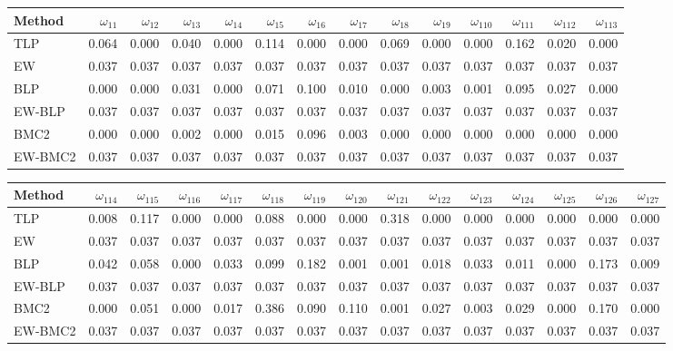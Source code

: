 \documentclass[
]{article}
\begin{document}
\begin{tabular}{lrrrrrrrrrrrrr}
\toprule
Method & $\omega_{11}$ & $\omega_{12}$ & $\omega_{13}$ & $\omega_{14}$ & $\omega_{15}$ & $\omega_{16}$ & $\omega_{17}$ & $\omega_{18}$ & $\omega_{19}$ & $\omega_{110}$ & $\omega_{111}$ & $\omega_{112}$ & $\omega_{113}$\\
\midrule
TLP & 0.064 & 0.000 & 0.040 & 0.000 & 0.114 & 0.000 & 0.000 & 0.069 & 0.000 & 0.000 & 0.162 & 0.020 & 0.000\\
EW & 0.037 & 0.037 & 0.037 & 0.037 & 0.037 & 0.037 & 0.037 & 0.037 & 0.037 & 0.037 & 0.037 & 0.037 & 0.037\\
BLP & 0.000 & 0.000 & 0.031 & 0.000 & 0.071 & 0.100 & 0.010 & 0.000 & 0.003 & 0.001 & 0.095 & 0.027 & 0.000\\
EW-BLP & 0.037 & 0.037 & 0.037 & 0.037 & 0.037 & 0.037 & 0.037 & 0.037 & 0.037 & 0.037 & 0.037 & 0.037 & 0.037\\
BMC2 & 0.000 & 0.000 & 0.002 & 0.000 & 0.015 & 0.096 & 0.003 & 0.000 & 0.000 & 0.000 & 0.000 & 0.000 & 0.000\\
EW-BMC2 & 0.037 & 0.037 & 0.037 & 0.037 & 0.037 & 0.037 & 0.037 & 0.037 & 0.037 & 0.037 & 0.037 & 0.037 & 0.037\\
\bottomrule
\end{tabular}

\begin{tabular}{lrrrrrrrrrrrrrr}
\toprule
Method & $\omega_{114}$ & $\omega_{115}$ & $\omega_{116}$ & $\omega_{117}$ & $\omega_{118}$ & $\omega_{119}$ & $\omega_{120}$ & $\omega_{121}$ & $\omega_{122}$ & $\omega_{123}$ & $\omega_{124}$ & $\omega_{125}$ & $\omega_{126}$ & $\omega_{127}$\\
\midrule
TLP & 0.008 & 0.117 & 0.000 & 0.000 & 0.088 & 0.000 & 0.000 & 0.318 & 0.000 & 0.000 & 0.000 & 0.000 & 0.000 & 0.000\\
EW & 0.037 & 0.037 & 0.037 & 0.037 & 0.037 & 0.037 & 0.037 & 0.037 & 0.037 & 0.037 & 0.037 & 0.037 & 0.037 & 0.037\\
BLP & 0.042 & 0.058 & 0.000 & 0.033 & 0.099 & 0.182 & 0.001 & 0.001 & 0.018 & 0.033 & 0.011 & 0.000 & 0.173 & 0.009\\
EW-BLP & 0.037 & 0.037 & 0.037 & 0.037 & 0.037 & 0.037 & 0.037 & 0.037 & 0.037 & 0.037 & 0.037 & 0.037 & 0.037 & 0.037\\
BMC2 & 0.000 & 0.051 & 0.000 & 0.017 & 0.386 & 0.090 & 0.110 & 0.001 & 0.027 & 0.003 & 0.029 & 0.000 & 0.170 & 0.000\\
EW-BMC2 & 0.037 & 0.037 & 0.037 & 0.037 & 0.037 & 0.037 & 0.037 & 0.037 & 0.037 & 0.037 & 0.037 & 0.037 & 0.037 & 0.037\\
\bottomrule
\end{tabular}
\end{document}
